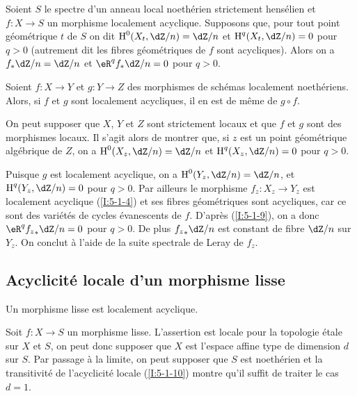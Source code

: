 \begin{corollary}\label{I:5-1-9}
Soient $S$ le spectre d'un anneau local noethérien strictement hensélien et 
$f:X\to S$ un morphisme localement acyclique. Supposons que, pour tout point 
géométrique $t$ de $S$ on dit $\h^0(X_t,\dZ/n) = \dZ/n$ et 
$\h^q(X_t,\dZ/n) = 0$ pour $q>0$ (autrement dit les fibres géométriques de 
$f$ sont acycliques). Alors on a $f_* \dZ/n = \dZ/n$ et $\eR^qf_*\dZ/n = 0$ pour 
$q>0$. 
\end{corollary}





\begin{corollary}\label{I:5-1-10}
Soient $f:X\to Y$ et $g:Y\to Z$ des morphismes de schémas localement 
noethériens. Alors, si $f$ et $g$ sont localement acycliques, il en est de 
même de $g\circ f$. 
\end{corollary}

On peut supposer que $X$, $Y$ et $Z$ sont strictement locaux et que $f$ et $g$ 
sont des morphismes locaux. Il s'agit alors de montrer que, si $z$ est un point 
géométrique algébrique de $Z$, on a $\h^0(X_z,\dZ/n) = \dZ/n$ et 
$\h^q(X_z,\dZ/n) = 0$ pour $q>0$. 

Puisque $g$ est localement acyclique, on a $\h^0(Y_z,\dZ/n) = \dZ/n$, et 
$\h^q(Y_z,\dZ/n) = 0$ pour $q>0$. Par ailleurs le morphisme $f_z:X_z\to Y_z$ est 
localement acyclique (\ref{I:5-1-4}) et ses fibres géométriques sont 
acycliques, car ce sont des variétés de cycles évanescents de $f$. 
D'après (\ref{I:5-1-9}), on a donc $\eR^q {f_z}_*\dZ/n = 0$ pour $q>0$. De plus 
${f_z}_*\dZ/n$ est constant de fibre $\dZ/n$ sur $Y_z$. On conclut à l'aide de 
la suite spectrale de Leray de $f_z$. 










\subsection{Acyclicité locale d'un morphisme lisse}\label{I:5-2}





\begin{theorem}\label{I:5-2-1}
Un morphisme lisse est localement acyclique.
\end{theorem}

Soit $f:X\to S$ un morphisme lisse. L'assertion est locale pour la topologie 
étale sur $X$ et $S$, on peut donc supposer que $X$ est l'espace affine type 
de dimension $d$ sur $S$. Par passage à la limite, on peut supposer que $S$ 
est noethérien et la transitivité de l'acyclicité locale (\ref{I:5-1-10}) montre 
qu'il suffit de traiter le cas $d=1$. 

